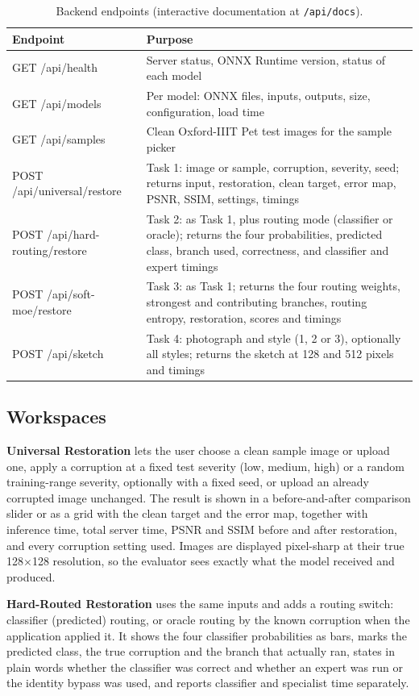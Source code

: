 \documentclass[conference]{IEEEtran}
\begin{document}
\begin{table}[t]
\centering
\caption{Backend endpoints (interactive documentation at \texttt{/api/docs}).}
\label{tab:api}
\footnotesize
\begin{tabular}{@{}p{2.9cm}p{4.9cm}@{}}
\toprule
Endpoint & Purpose \\
\midrule
GET /api/health & Server status, ONNX Runtime version, status of each model \\
GET /api/models & Per model: ONNX files, inputs, outputs, size, configuration, load time \\
GET /api/samples & Clean Oxford-IIIT Pet test images for the sample picker \\
POST /api/universal/restore & Task 1: image or sample, corruption, severity, seed; returns input, restoration, clean target, error map, PSNR, SSIM, settings, timings \\
POST /api/hard-routing/restore & Task 2: as Task 1, plus routing mode (classifier or oracle); returns the four probabilities, predicted class, branch used, correctness, and classifier and expert timings \\
POST /api/soft-moe/restore & Task 3: as Task 1; returns the four routing weights, strongest and contributing branches, routing entropy, restoration, scores and timings \\
POST /api/sketch & Task 4: photograph and style (1, 2 or 3), optionally all styles; returns the sketch at 128 and 512 pixels and timings \\
\bottomrule
\end{tabular}
\end{table}

\subsection{Workspaces}
\textbf{Universal Restoration} lets the user choose a clean sample image or upload one, apply a corruption at a fixed test severity (low, medium, high) or a random training-range severity, optionally with a fixed seed, or upload an already corrupted image unchanged. The result is shown in a before-and-after comparison slider or as a grid with the clean target and the error map, together with inference time, total server time, PSNR and SSIM before and after restoration, and every corruption setting used. Images are displayed pixel-sharp at their true 128$\times$128 resolution, so the evaluator sees exactly what the model received and produced.

\textbf{Hard-Routed Restoration} uses the same inputs and adds a routing switch: classifier (predicted) routing, or oracle routing by the known corruption when the application applied it. It shows the four classifier probabilities as bars, marks the predicted class, the true corruption and the branch that actually ran, states in plain words whether the classifier was correct and whether an expert was run or the identity bypass was used, and reports classifier and specialist time separately.
\end{document}
